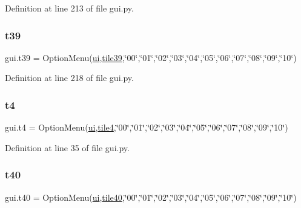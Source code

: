 Definition at line 213 of file gui.\+py.

\mbox{\label{namespacegui_a4e686d2678f35f161517c3017479876a}} 
\subsubsection{\texorpdfstring{t39}{t39}}
{\footnotesize\ttfamily gui.\+t39 = Option\+Menu(\mbox{\hyperlink{namespacegui_a40ab7281456eadbea2dc2038f5c24fa1}{ui}},\mbox{\hyperlink{namespacegui_ac73444c8a69cc21b256a72290397a012}{tile39}},\char`\"{}00\char`\"{},\char`\"{}01\char`\"{},\char`\"{}02\char`\"{},\char`\"{}03\char`\"{},\char`\"{}04\char`\"{},\char`\"{}05\char`\"{},\char`\"{}06\char`\"{},\char`\"{}07\char`\"{},\char`\"{}08\char`\"{},\char`\"{}09\char`\"{},\char`\"{}10\char`\"{})}



Definition at line 218 of file gui.\+py.

\mbox{\label{namespacegui_a5f85979d64e0d248803bae1d0d37e6ae}} 
\subsubsection{\texorpdfstring{t4}{t4}}
{\footnotesize\ttfamily gui.\+t4 = Option\+Menu(\mbox{\hyperlink{namespacegui_a40ab7281456eadbea2dc2038f5c24fa1}{ui}},\mbox{\hyperlink{namespacegui_ad05cf08ea2bd8331ecd579ff357ba470}{tile4}},\char`\"{}00\char`\"{},\char`\"{}01\char`\"{},\char`\"{}02\char`\"{},\char`\"{}03\char`\"{},\char`\"{}04\char`\"{},\char`\"{}05\char`\"{},\char`\"{}06\char`\"{},\char`\"{}07\char`\"{},\char`\"{}08\char`\"{},\char`\"{}09\char`\"{},\char`\"{}10\char`\"{})}



Definition at line 35 of file gui.\+py.

\mbox{\label{namespacegui_afca94295ff8d04495ee9d6d60db58ecb}} 
\subsubsection{\texorpdfstring{t40}{t40}}
{\footnotesize\ttfamily gui.\+t40 = Option\+Menu(\mbox{\hyperlink{namespacegui_a40ab7281456eadbea2dc2038f5c24fa1}{ui}},\mbox{\hyperlink{namespacegui_abecd47cdd67a62874fe67c1538ecaddd}{tile40}},\char`\"{}00\char`\"{},\char`\"{}01\char`\"{},\char`\"{}02\char`\"{},\char`\"{}03\char`\"{},\char`\"{}04\char`\"{},\char`\"{}05\char`\"{},\char`\"{}06\char`\"{},\char`\"{}07\char`\"{},\char`\"{}08\char`\"{},\char`\"{}09\char`\"{},\char`\"{}10\char`\"{})}



